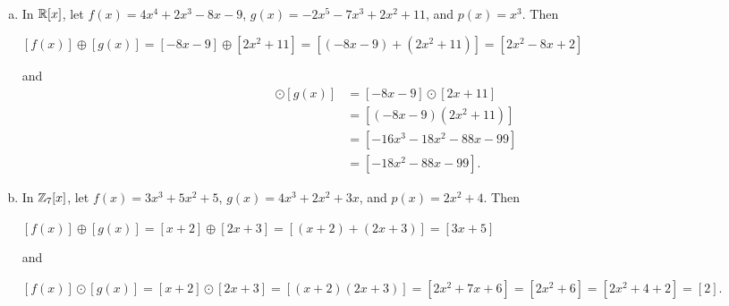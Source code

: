 \documentclass[11pt,fleqn,dvipsnames,usenames]{article}
\begin{document}
\begin{examples}~
\begin{enumerate}[(a)]
\item In $\mathbb{R}[x]$, let $f(x) = 4x^4 + 2x^3 - 8x -9$, $g(x) = -2x^5 - 7x^3 + 2x^2 + 11$, and $p(x) = x^3$.  Then
\begin{center}
$[f(x)]\oplus [g(x)] = [-8x - 9] \oplus [2x^2 + 11] = [(-8x - 9) + (2x^2 + 11)] = [2x^2 - 8x + 2]$
\end{center}
and
\begin{align*}
[f(x)]\odot [g(x)] &= [-8x-9]\odot[2x + 11]\\
&= [(-8x - 9)(2x^2 + 11)]\\
&= [-16x^3 - 18x^2 - 88x - 99]\\
&= [-18x^2 - 88x - 99].
\end{align*}
\vsmsp

\item In $\mathbb{Z}_7[x]$, let $f(x) = 3x^3 + 5x^2 + 5$, $g(x) = 4x^3 + 2x^2 + 3x$, and $p(x) = 2x^2 + 4$.  Then
\begin{center}
$[f(x)]\oplus [g(x)] = [x + 2]\oplus [2x+3] = [(x + 2) + (2x + 3)] = [3x + 5]$
\end{center}
and
\begin{center}
$[f(x)]\odot [g(x)] = [x+2]\odot [2x+3] = [(x+2)(2x +3)] = [2x^2 + 7x + 6] = [2x^2 + 6] = [2x^2 + 4 + 2] = [2]$.
\end{center}
\end{enumerate}
\end{examples}
\smsp
\end{document}
